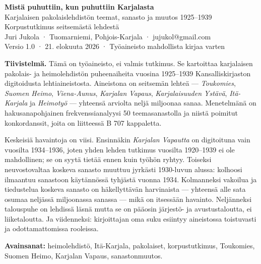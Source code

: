 \documentclass[10pt,a4paper]{article}
\begin{document}
\begin{center}
{\sansfont\bfseries\LARGE\color{meri} Mistä puhuttiin, kun puhuttiin Karjalasta}\\[0.35em]
{\sansfont\large Karjalaisen pakolaislehdistön teemat, sanasto ja muutos 1925--1939}\\[0.3em]
{\sansfont\normalsize\color{harmaa} Korpustutkimus seitsemästä lehdestä}\\[0.9em]
{\footnotesize Juri Jukola · Tuomarniemi, Pohjois-Karjala · jujukol@gmail.com}\\[0.15em]
{\footnotesize\color{harmaa} Versio 1.0 · 21. elokuuta 2026 · Työaineisto mahdollista kirjaa varten}
\end{center}
\vspace{1.0em}

\textbf{Tiivistelmä.} Tämä on työaineisto, ei valmis tutkimus. Se kartoittaa
karjalaisen pakolais- ja heimolehdistön puheenaiheita vuosina 1925--1939 Kansalliskirjaston
digitoidusta lehtiaineistosta. Aineistona on seitsemän lehteä --- \emph{Toukomies},
\emph{Suomen Heimo}, \emph{Viena-Aunus}, \emph{Karjalan Vapaus},
\emph{Karjalaisuuden Ystävä}, \emph{Itä-Karjala} ja \emph{Heimotyö} --- yhteensä
arviolta neljä miljoonaa sanaa. Menetelmänä on hakusanapohjainen frekvenssianalyysi
50 teemasanastolla ja niistä poimitut konkordanssit, joita on liitteessä B 707 kappaletta.

Keskeisiä havaintoja on viisi. Ensinnäkin \emph{Karjalan Vapautta} on digitoituna vain
vuosilta 1934--1936, joten yhden lehden tutkimus vuosilta 1920--1939 ei ole
mahdollinen; se on syytä tietää ennen kuin työhön ryhtyy. Toiseksi neuvostovaltaa
koskeva sanasto muuttuu jyrkästi 1930-luvun alussa: kolhoosi ilmaantuu sanastoon
käytännössä tyhjästä vuonna 1934. Kolmanneksi vakoilua ja tiedustelua koskeva sanasto
on häkellyttävän harvinaista --- yhteensä alle sata osumaa neljässä miljoonassa
sanassa --- mikä on itsessään havainto. Neljänneksi talouspuhe on lehdissä läsnä
mutta se on pääosin järjestö- ja avustustaloutta, ei liiketaloutta. Ja viidenneksi:
kirjoittajan oma suku esiintyy aineistossa toistuvasti ja odottamattomissa rooleissa.

\textbf{Avainsanat:} heimolehdistö, Itä-Karjala, pakolaiset, korpustutkimus, Toukomies,
Suomen Heimo, Karjalan Vapaus, sanastonmuutos.
\vspace{0.4em}
\end{document}
